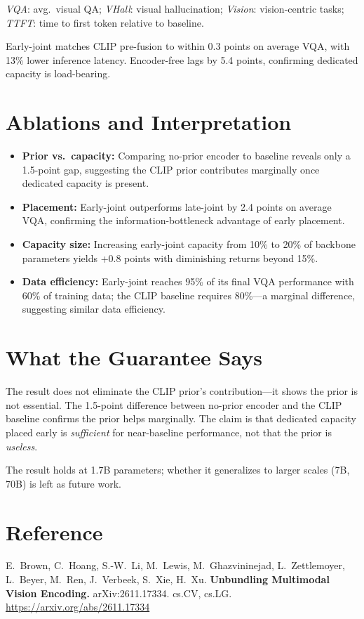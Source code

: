 \documentclass[10pt,twocolumn]{article}
\begin{document}
\noindent\textit{VQA}: avg.\ visual QA; \textit{VHall}: visual hallucination; \textit{Vision}: vision-centric tasks; \textit{TTFT}: time to first token relative to baseline.

Early-joint matches CLIP pre-fusion to within 0.3 points on average VQA, with 13\% lower inference latency.
Encoder-free lags by 5.4 points, confirming dedicated capacity is load-bearing.

\section{Ablations and Interpretation}

\begin{itemize}[leftmargin=1em,itemsep=2pt]
  \item \textbf{Prior vs.\ capacity:} Comparing no-prior encoder to baseline reveals only a 1.5-point gap, suggesting the CLIP prior contributes marginally once dedicated capacity is present.
  \item \textbf{Placement:} Early-joint outperforms late-joint by 2.4 points on average VQA, confirming the information-bottleneck advantage of early placement.
  \item \textbf{Capacity size:} Increasing early-joint capacity from 10\% to 20\% of backbone parameters yields +0.8 points with diminishing returns beyond 15\%.
  \item \textbf{Data efficiency:} Early-joint reaches 95\% of its final VQA performance with 60\% of training data; the CLIP baseline requires 80\%---a marginal difference, suggesting similar data efficiency.
\end{itemize}

\section{What the Guarantee Says}

The result does not eliminate the CLIP prior's contribution---it shows the prior is not essential.
The 1.5-point difference between no-prior encoder and the CLIP baseline confirms the prior helps marginally.
The claim is that dedicated capacity placed early is \emph{sufficient} for near-baseline performance, not that the prior is \emph{useless}.

The result holds at 1.7B parameters; whether it generalizes to larger scales (7B, 70B) is left as future work.

\section*{Reference}
E.\ Brown, C.\ Hoang, S.-W.\ Li, M.\ Lewis, M.\ Ghazvininejad, L.\ Zettlemoyer, L.\ Beyer, M.\ Ren, J.\ Verbeek, S.\ Xie, H.\ Xu.
\textbf{Unbundling Multimodal Vision Encoding.}
arXiv:2611.17334. cs.CV, cs.LG.
\url{https://arxiv.org/abs/2611.17334}
\end{document}
